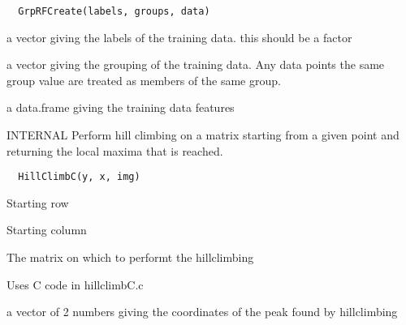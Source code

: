 \documentclass[a4paper]{book}
\begin{document}
%
\begin{Usage}
\begin{verbatim}
  GrpRFCreate(labels, groups, data)
\end{verbatim}
\end{Usage}
%
\begin{Arguments}
\begin{ldescription}
\item[\code{labels}] a vector giving the labels of the training
data.  this should be a factor

\item[\code{groups}] a vector giving the grouping of the
training data.  Any data points the same group value are
treated as members of the same group.

\item[\code{data}] a data.frame giving the training data
features
\end{ldescription}
\end{Arguments}
%
\begin{Description}\relax
INTERNAL Perform hill climbing on a matrix starting from
a given point and returning the local maxima that is
reached.
\end{Description}
%
\begin{Usage}
\begin{verbatim}
  HillClimbC(y, x, img)
\end{verbatim}
\end{Usage}
%
\begin{Arguments}
\begin{ldescription}
\item[\code{y}] Starting row

\item[\code{x}] Starting column

\item[\code{img}] The matrix on which to performt the
hillclimbing
\end{ldescription}
\end{Arguments}
%
\begin{Details}\relax
Uses C code in hillclimbC.c
\end{Details}
%
\begin{Value}
a vector of 2 numbers giving the coordinates of the peak
found by hillclimbing
\end{Value}
\end{document}

